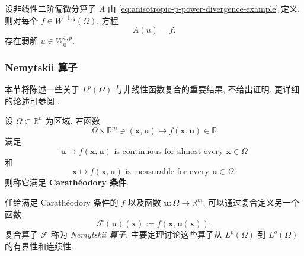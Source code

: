 \begin{Theorem}
\label{thm:anisotropic-p-power-dirichlet-existence}
设非线性二阶偏微分算子 $A$ 由 \eqref{eq:anisotropic-p-power-divergence-example} 定义. 则对每个 $f\in W^{-1,q}(\Omega)$, 方程
\begin{equation}\label{eq:anisotropic-p-power-dirichlet-existence-equation}
A(u)=f.
\end{equation}
存在弱解 $u\in W_0^{1,p}$.
\end{Theorem}

\subsubsection{Nemytskii 算子}\label{subsec:nemytskii-operators}

本节将陈述一些关于 $L^p(\Omega)$ 与非线性函数复合的重要结果, 不给出证明. 更详细的论述可参阅 \cite{Li}.

\begin{Definition}
\label{def:caratheodory-conditions}
设 $\Omega\subset\mathbb{R}^n$ 为区域. 若函数
\begin{equation}\label{eq:caratheodory-nonlinear-function-domain}
\Omega\times\mathbb{R}^m\ni(\bm{x},\bm{u})\mapsto f(\bm{x},\bm{u})\in\mathbb{R}
\end{equation}
满足
\begin{equation}\label{eq:caratheodory-value-variable-continuity}
\bm{u}\mapsto f(\bm{x},\bm{u})\text{ is continuous for almost every }\bm{x}\in\Omega
\end{equation}
和
\begin{equation}\label{eq:caratheodory-spatial-measurability-printed-domain}
\bm{x}\mapsto f(\bm{x},\bm{u})\text{ is measurable for every }\bm{u}\in\Omega.
\end{equation}
则称它满足 \textbf{Carathéodory 条件}.
\end{Definition}

任给满足 Carathéodory 条件的 $f$ 以及函数 $\bm{u}:\Omega\to\mathbb{R}^m$, 可以通过复合定义另一个函数
\begin{equation}\label{eq:nemytskii-pointwise-composition-operator}
\mathcal{F}(\bm{u})(\bm{x}):=f(\bm{x},\bm{u}(\bm{x})).
\end{equation}
复合算子 $\mathcal{F}$ 称为 \emph{Nemytskii 算子}. 主要定理讨论这些算子从 $L^p(\Omega)$ 到 $L^q(\Omega)$ 的有界性和连续性.

